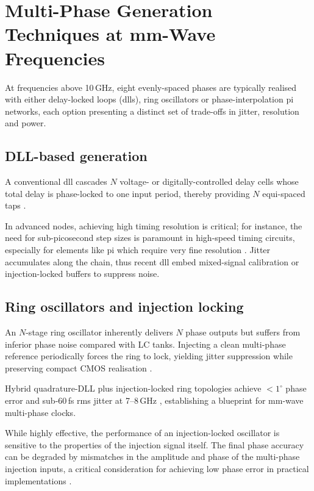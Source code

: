 
\section{Multi-Phase Generation Techniques at mm-Wave Frequencies}
At frequencies above 10\,GHz, eight evenly-spaced phases are typically realised with either delay-locked loops (\glspl{dll}), ring oscillators or phase-interpolation \gls{pi} networks, each option presenting a distinct set of trade-offs in jitter, resolution and power.

\subsection{DLL-based generation}
A conventional \gls{dll} cascades $N$ voltage- or digitally-controlled delay cells whose total delay is phase-locked to one input period, thereby providing $N$ equi-spaced taps \cite{Wang2021JSSC}.

In advanced nodes, achieving high timing resolution is critical; for instance, the need for sub-picosecond step sizes is paramount in high-speed timing circuits, especially for elements like \gls{pi} which require very fine resolution \cite{Mishra2022ISSCC}.
Jitter accumulates along the chain, thus recent \gls{dll} embed mixed-signal calibration or injection-locked buffers to suppress noise.

\subsection{Ring oscillators and injection locking}
An $N$-stage ring oscillator inherently delivers $N$ phase outputs but suffers from inferior phase noise compared with LC tanks. Injecting a clean multi-phase reference periodically forces the ring to lock, yielding jitter suppression while preserving compact CMOS realisation \cite{Wang2021JSSC}.

Hybrid quadrature-DLL plus injection-locked ring topologies achieve $<\!1^{\circ}$ phase error and sub-60\,fs rms jitter at 7–8\,GHz \cite{Wang2021JSSC}, establishing a blueprint for mm-wave multi-phase clocks.

While highly effective, the performance of an injection-locked oscillator is sensitive to the properties of the injection signal itself. The final phase accuracy can be degraded by mismatches in the amplitude and phase of the multi-phase injection inputs, a critical consideration for achieving low phase error in practical implementations \cite{Wang2025ArXiv}.

